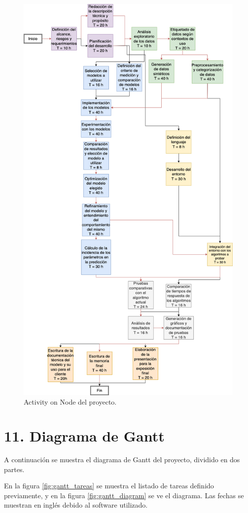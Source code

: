 \documentclass[
11pt, %
]{charter}
\begin{document}
\begin{figure}[htpb]
	\centering 
	\includegraphics[width=.75\textwidth]{./Figuras/amrra-AON.png}
	\caption{Activity on Node del proyecto.}
	\label{fig:aon}
\end{figure}

\section{11. Diagrama de Gantt}
\label{sec:gantt}

A continuación se muestra el diagrama de Gantt del proyecto, dividido en dos partes.

En la figura \ref{fig:gantt_tareas} se muestra el listado de tareas definido previamente, y en la figura  \ref{fig:gantt_diagram} se ve el diagrama. Las fechas se muestran en inglés debido al software utilizado. 
\end{document}
